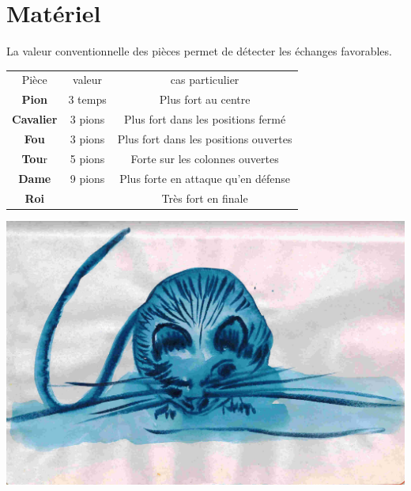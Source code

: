 
\chapter{Matériel}


La valeur conventionnelle des pièces permet de détecter les échanges favorables.

\begin{center}
\begin{tabular}{ccc}
Pièce & valeur & cas particulier \\
{\bf Pion} & 3 temps & Plus fort au centre \\
{\bf Cavalier} & 3 pions & Plus fort dans les positions fermé \\
{\bf Fou} & 3 pions & Plus fort dans les positions ouvertes\\
{\bf Tou}r & 5 pions & Forte sur les colonnes ouvertes \\
{\bf Dame} & 9 pions & Plus forte en attaque qu'en défense\\
{\bf Roi} &  & Très fort en finale\\
\end{tabular}
\end{center}

\vfill

\begin{center}
\includegraphics[scale=.5]{./image/souris10}
\end{center}

\vfill


